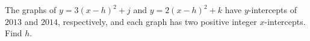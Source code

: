 The graphs of $y=3(x-h)^2+j$ and $y=2(x-h)^2+k$ have $y$-intercepts of $2013$ and $2014$, respectively, and each graph has two positive integer $x$-intercepts. Find $h$.